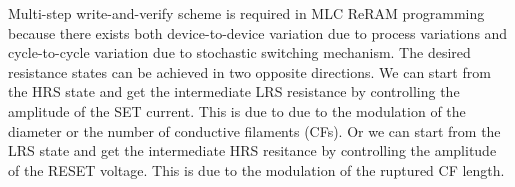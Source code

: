 Multi-step write-and-verify scheme is required in MLC ReRAM programming because there exists both device-to-device variation due to process variations and cycle-to-cycle variation due to stochastic switching mechanism. The desired resistance states can be achieved in two opposite directions. We can start from the HRS state and get the intermediate LRS resistance by controlling the amplitude of the SET current. This is due to due to the modulation of the diameter or the number of conductive filaments (CFs). Or we can start from the LRS state and get the intermediate HRS resitance by controlling the amplitude of the RESET voltage. This is due to the modulation of the ruptured CF length.



